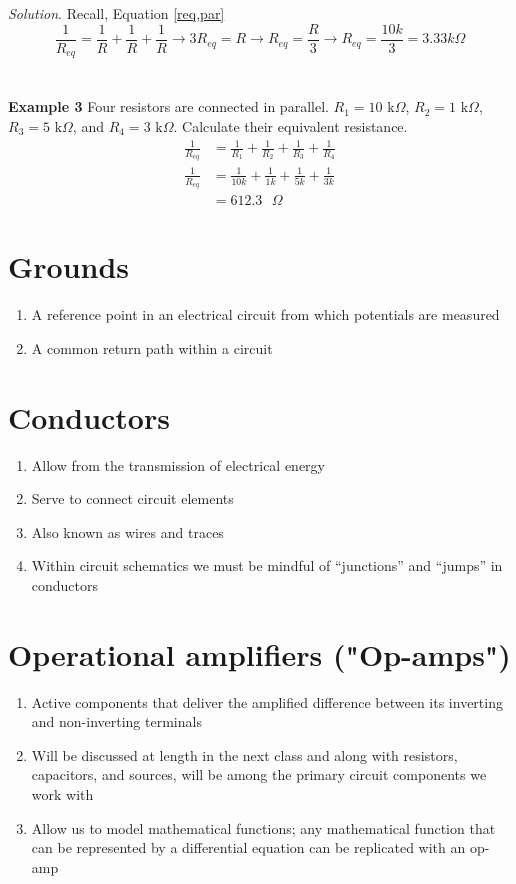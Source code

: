 \documentclass[11pt]{book}
\begin{document}
\textit{Solution}.
Recall, Equation \ref{req,par}
\begin{equation}
	\frac{1}{R_{eq}} = \frac{1}{R} + \frac{1}{R} + \frac{1}{R} \rightarrow 3R_{eq} = R \rightarrow R_{eq} = \frac{R}{3} \rightarrow R_{eq} = \frac{10k}{3} = 3.33 k\Omega
\end{equation}
\\
\\
\textbf{Example 3}
Four resistors are connected in parallel. $R_1 = 10 \text{ k}\Omega$, $R_2 = 1 \text{ k}\Omega$, $R_3 = 5 \text{ k}\Omega$, and $R_4 = 3 \text{ k}\Omega$. Calculate their equivalent resistance.
\begin{align}
	\frac{1}{R_{eq}} &= \frac{1}{R_1} + \frac{1}{R_2} + \frac{1}{R_3} + \frac{1}{R_4} \\
	\frac{1}{R_{eq}} &= \frac{1}{10k} + \frac{1}{1k} + \frac{1}{5k} + \frac{1}{3k} \\
	&= 612.3 \text{ }\Omega
\end{align}

\section{Grounds}
\begin{enumerate}
	\item A reference point in an electrical circuit from which potentials are measured
	\item A common return path within a circuit
\end{enumerate}


\section{Conductors}
\begin{enumerate}
	\item Allow from the transmission of electrical energy
	\item Serve to connect circuit elements
	\item Also known as wires and traces
	\item Within circuit schematics we must be mindful of ``junctions'' and ``jumps'' in conductors
\end{enumerate}


\section{Operational amplifiers ("Op-amps")}
\begin{enumerate}
	\item Active components that deliver the amplified difference between its inverting and non-inverting terminals
	\item Will be discussed at length in the next class and along with resistors, capacitors, and sources, will be among the primary circuit components we work with
	\item Allow us to model mathematical functions; any mathematical function that can be represented by a differential equation can be replicated with an op-amp
\end{enumerate}
\end{document}
